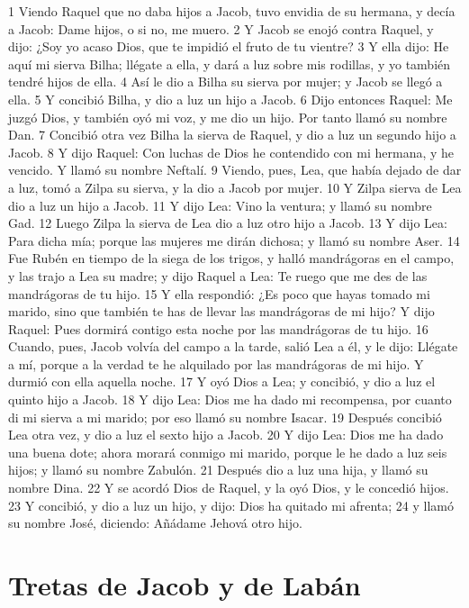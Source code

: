 1 Viendo Raquel que no daba hijos a Jacob, tuvo envidia de su hermana, y decía a Jacob: Dame hijos, o si no, me muero.
2 Y Jacob se enojó contra Raquel, y dijo: ¿Soy yo acaso Dios, que te impidió el fruto de tu vientre?
3 Y ella dijo: He aquí mi sierva Bilha; llégate a ella, y dará a luz sobre mis rodillas, y yo también tendré hijos de ella.
4 Así le dio a Bilha su sierva por mujer; y Jacob se llegó a ella.
5 Y concibió Bilha, y dio a luz un hijo a Jacob.
6 Dijo entonces Raquel: Me juzgó Dios, y también oyó mi voz, y me dio un hijo. Por tanto llamó su nombre Dan.
7 Concibió otra vez Bilha la sierva de Raquel, y dio a luz un segundo hijo a Jacob.
8 Y dijo Raquel: Con luchas de Dios he contendido con mi hermana, y he vencido. Y llamó su nombre Neftalí.
9 Viendo, pues, Lea, que había dejado de dar a luz, tomó a Zilpa su sierva, y la dio a Jacob por mujer.
10 Y Zilpa sierva de Lea dio a luz un hijo a Jacob.
11 Y dijo Lea: Vino la ventura; y llamó su nombre Gad.
12 Luego Zilpa la sierva de Lea dio a luz otro hijo a Jacob.
13 Y dijo Lea: Para dicha mía; porque las mujeres me dirán dichosa; y llamó su nombre Aser.
14 Fue Rubén en tiempo de la siega de los trigos, y halló mandrágoras en el campo, y las trajo a Lea su madre; y dijo Raquel a Lea: Te ruego que me des de las mandrágoras de tu hijo.
15 Y ella respondió: ¿Es poco que hayas tomado mi marido, sino que también te has de llevar las mandrágoras de mi hijo? Y dijo Raquel: Pues dormirá contigo esta noche por las mandrágoras de tu hijo.
16 Cuando, pues, Jacob volvía del campo a la tarde, salió Lea a él, y le dijo: Llégate a mí, porque a la verdad te he alquilado por las mandrágoras de mi hijo. Y durmió con ella aquella noche.
17 Y oyó Dios a Lea; y concibió, y dio a luz el quinto hijo a Jacob.
18 Y dijo Lea: Dios me ha dado mi recompensa, por cuanto di mi sierva a mi marido; por eso llamó su nombre Isacar.
19 Después concibió Lea otra vez, y dio a luz el sexto hijo a Jacob.
20 Y dijo Lea: Dios me ha dado una buena dote; ahora morará conmigo mi marido, porque le he dado a luz seis hijos; y llamó su nombre Zabulón.
21 Después dio a luz una hija, y llamó su nombre Dina.
22 Y se acordó Dios de Raquel, y la oyó Dios, y le concedió hijos.
23 Y concibió, y dio a luz un hijo, y dijo: Dios ha quitado mi afrenta;
24 y llamó su nombre José, diciendo: Añádame Jehová otro hijo.

\section*{Tretas de Jacob y de Labán}

